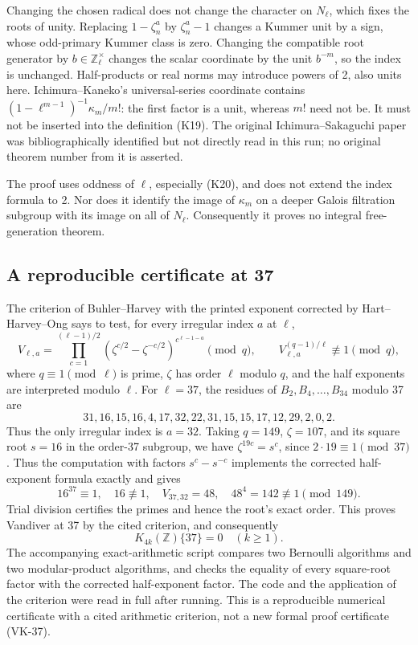 \documentclass[11pt,a4paper]{article}
\theoremstyle{definition}
\begin{document}
Changing the chosen radical does not change the character
on \(N_\ell\), which fixes the roots of unity.
Replacing \(1-\zeta_n^a\) by \(\zeta_n^a-1\) changes a
Kummer unit by a sign, whose odd-primary Kummer class is
zero. Changing the compatible root generator by
\(b\in\mathbb Z_\ell^\times\) changes the scalar coordinate
by the unit \(b^{-m}\), so the index is unchanged.
Half-products or real norms may introduce powers of 2,
also units here. Ichimura--Kaneko's universal-series
coordinate \cite[\S1.1, pp.~313--314]{IchimuraKaneko1989}
contains \((1-\ell^{m-1})^{-1}\kappa_m/m!\):
the first factor is a unit, whereas \(m!\) need not be.
It must not be inserted into the definition (K19).
The original Ichimura--Sakaguchi paper was bibliographically
identified but not directly read in this run; no original
theorem number from it is asserted.

The proof uses oddness of \(\ell\), especially (K20), and
does not extend the index formula to 2. Nor does it
identify the image of \(\kappa_m\) on a deeper Galois
filtration subgroup with its image on all of \(N_\ell\).
Consequently it proves no integral free-generation theorem.

\subsection{A reproducible certificate at 37}

The criterion of Buhler--Harvey
\cite[\S4, author preprint pp.~4--5]{BuhlerHarvey2011}
with the printed exponent corrected by Hart--Harvey--Ong
\cite[\S7, author preprint p.~13]{HartHarveyOng2017}
says to test, for every irregular index \(a\) at \(\ell\),
\[
 V_{\ell,a}=
 \prod_{c=1}^{(\ell-1)/2}
   (\zeta^{c/2}-\zeta^{-c/2})^{c^{\ell-1-a}}\pmod q,\qquad
 V_{\ell,a}^{(q-1)/\ell}\not\equiv1\pmod q,           \tag{K21}
\]
where \(q\equiv1\pmod\ell\) is prime, \(\zeta\) has order
\(\ell\) modulo \(q\), and the half exponents are interpreted
modulo \(\ell\).
For \(\ell=37\), the residues of
\(B_2,B_4,\ldots,B_{34}\) modulo 37 are
\[
31,16,15,16,4,17,32,22,31,15,15,17,12,29,2,0,2.
\]
Thus the only irregular index is \(a=32\).
Taking \(q=149\), \(\zeta=107\), and its square root
\(s=16\) in the order-37 subgroup, we have
\(\zeta^{19c}=s^c\), since \(2\cdot19\equiv1\pmod{37}\).
Thus the computation with factors \(s^c-s^{-c}\) implements
the corrected half-exponent formula exactly and gives
\[
 16^{37}\equiv1,\quad16\not\equiv1,\quad
 V_{37,32}=48,\quad48^4=142\not\equiv1\pmod{149}.
\]
Trial division certifies the primes and hence the root's
exact order. This proves Vandiver at 37 by the cited
criterion, and consequently
\[
 K_{4k}(\mathbb Z)\{37\}=0\quad(k\ge1).
\]
The accompanying exact-arithmetic script compares two
Bernoulli algorithms and two modular-product algorithms,
and checks the equality of every square-root factor with
the corrected half-exponent factor.
The code and the application of the criterion were read
in full after running. This is a reproducible numerical
certificate with a cited arithmetic criterion, not a new
formal proof certificate (VK-37).
\end{document}
